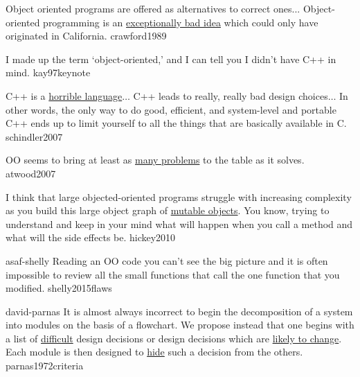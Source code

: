 \documentclass{article}
\begin{document}
  {Object oriented programs are offered as alternatives to correct ones... Object-oriented programming is an \ul{exceptionally bad idea} which could only have originated in California.}
  {crawford1989}

  {I made up the term `object-oriented,' and I can tell you I didn't have C++ in mind.}
  {kay97keynote}

  {C++ is a \ul{horrible language}$\dots$ C++ leads to really, really bad design choices$\dots$ In other words, the only way to do good, efficient, and system-level and portable C++ ends up to limit yourself to all the things that are basically available in C.}
  {schindler2007}

  {OO seems to bring at least as \ul{many problems} to the table as it solves.}
  {atwood2007}

  {I think that large objected-oriented programs struggle with increasing complexity as you build this large object graph of \ul{mutable objects}. You know, trying to understand and keep in your mind what will happen when you call a method and what will the side effects be.}
  {hickey2010}


\lnQuote
  {asaf-shelly}
  {Reading an OO code you can't see the big picture and it is often impossible to review all the small functions that call the one function that you modified.}
  {shelly2015flaws}



\lnQuote
  {david-parnas}
  {It is almost always incorrect to begin the decomposition of a system into modules on the basis of a flowchart. We propose instead that one begins with a list of \ul{difficult} design decisions or design decisions which are \ul{likely to change}. Each module is then designed to \ul{hide} such a decision from the others.}
  {parnas1972criteria}
\end{document}
